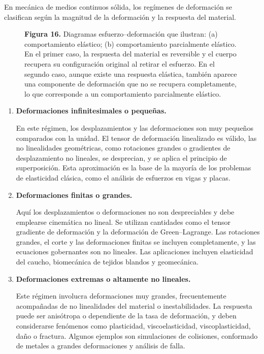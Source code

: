 En mecánica de medios continuos sólida, los regímenes de deformación se clasifican según la magnitud de la deformación y la respuesta del material.

\begin{figure}[H]
\centering

\par\medskip
\textbf{Figura 16.} Diagramas esfuerzo--deformación que ilustran: (a) comportamiento elástico; (b) comportamiento parcialmente elástico. En el primer caso, la respuesta del material es reversible y el cuerpo recupera su configuración original al retirar el esfuerzo. En el segundo caso, aunque existe una respuesta elástica, también aparece una componente de deformación que no se recupera completamente, lo que corresponde a un comportamiento parcialmente elástico.
\end{figure}

\begin{enumerate}
\item \textbf{Deformaciones infinitesimales o pequeñas.}

En este régimen, los desplazamientos y las deformaciones son muy pequeños comparados con la unidad. El tensor de deformación linealizado es válido, las no linealidades geométricas, como rotaciones grandes o gradientes de desplazamiento no lineales, se desprecian, y se aplica el principio de superposición. Esta aproximación es la base de la mayoría de los problemas de elasticidad clásica, como el análisis de esfuerzos en vigas y placas.

\item \textbf{Deformaciones finitas o grandes.}

Aquí los desplazamientos o deformaciones no son despreciables y debe emplearse cinemática no lineal. Se utilizan cantidades como el tensor gradiente de deformación y la deformación de Green--Lagrange. Las rotaciones grandes, el corte y las deformaciones finitas se incluyen completamente, y las ecuaciones gobernantes son no lineales. Las aplicaciones incluyen elasticidad del caucho, biomecánica de tejidos blandos y geomecánica.

\item \textbf{Deformaciones extremas o altamente no lineales.}

Este régimen involucra deformaciones muy grandes, frecuentemente acompañadas de no linealidades del material o inestabilidades. La respuesta puede ser anisótropa o dependiente de la tasa de deformación, y deben considerarse fenómenos como plasticidad, viscoelasticidad, viscoplasticidad, daño o fractura. Algunos ejemplos son simulaciones de colisiones, conformado de metales a grandes deformaciones y análisis de falla.
\end{enumerate}

